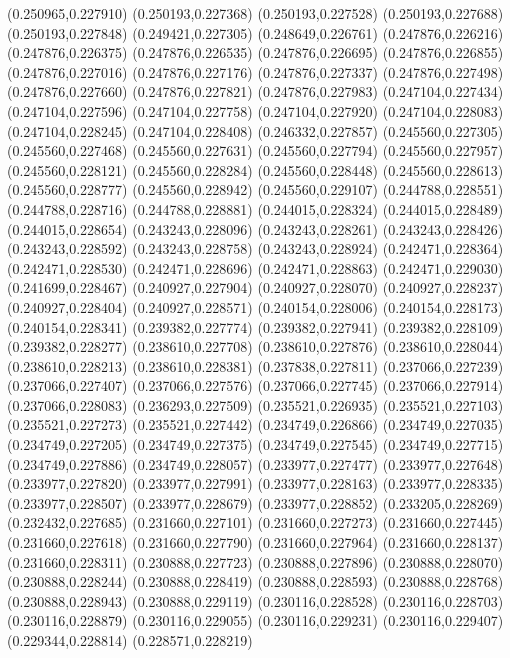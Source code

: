 (0.250965,0.227910)
(0.250193,0.227368)
(0.250193,0.227528)
(0.250193,0.227688)
(0.250193,0.227848)
(0.249421,0.227305)
(0.248649,0.226761)
(0.247876,0.226216)
(0.247876,0.226375)
(0.247876,0.226535)
(0.247876,0.226695)
(0.247876,0.226855)
(0.247876,0.227016)
(0.247876,0.227176)
(0.247876,0.227337)
(0.247876,0.227498)
(0.247876,0.227660)
(0.247876,0.227821)
(0.247876,0.227983)
(0.247104,0.227434)
(0.247104,0.227596)
(0.247104,0.227758)
(0.247104,0.227920)
(0.247104,0.228083)
(0.247104,0.228245)
(0.247104,0.228408)
(0.246332,0.227857)
(0.245560,0.227305)
(0.245560,0.227468)
(0.245560,0.227631)
(0.245560,0.227794)
(0.245560,0.227957)
(0.245560,0.228121)
(0.245560,0.228284)
(0.245560,0.228448)
(0.245560,0.228613)
(0.245560,0.228777)
(0.245560,0.228942)
(0.245560,0.229107)
(0.244788,0.228551)
(0.244788,0.228716)
(0.244788,0.228881)
(0.244015,0.228324)
(0.244015,0.228489)
(0.244015,0.228654)
(0.243243,0.228096)
(0.243243,0.228261)
(0.243243,0.228426)
(0.243243,0.228592)
(0.243243,0.228758)
(0.243243,0.228924)
(0.242471,0.228364)
(0.242471,0.228530)
(0.242471,0.228696)
(0.242471,0.228863)
(0.242471,0.229030)
(0.241699,0.228467)
(0.240927,0.227904)
(0.240927,0.228070)
(0.240927,0.228237)
(0.240927,0.228404)
(0.240927,0.228571)
(0.240154,0.228006)
(0.240154,0.228173)
(0.240154,0.228341)
(0.239382,0.227774)
(0.239382,0.227941)
(0.239382,0.228109)
(0.239382,0.228277)
(0.238610,0.227708)
(0.238610,0.227876)
(0.238610,0.228044)
(0.238610,0.228213)
(0.238610,0.228381)
(0.237838,0.227811)
(0.237066,0.227239)
(0.237066,0.227407)
(0.237066,0.227576)
(0.237066,0.227745)
(0.237066,0.227914)
(0.237066,0.228083)
(0.236293,0.227509)
(0.235521,0.226935)
(0.235521,0.227103)
(0.235521,0.227273)
(0.235521,0.227442)
(0.234749,0.226866)
(0.234749,0.227035)
(0.234749,0.227205)
(0.234749,0.227375)
(0.234749,0.227545)
(0.234749,0.227715)
(0.234749,0.227886)
(0.234749,0.228057)
(0.233977,0.227477)
(0.233977,0.227648)
(0.233977,0.227820)
(0.233977,0.227991)
(0.233977,0.228163)
(0.233977,0.228335)
(0.233977,0.228507)
(0.233977,0.228679)
(0.233977,0.228852)
(0.233205,0.228269)
(0.232432,0.227685)
(0.231660,0.227101)
(0.231660,0.227273)
(0.231660,0.227445)
(0.231660,0.227618)
(0.231660,0.227790)
(0.231660,0.227964)
(0.231660,0.228137)
(0.231660,0.228311)
(0.230888,0.227723)
(0.230888,0.227896)
(0.230888,0.228070)
(0.230888,0.228244)
(0.230888,0.228419)
(0.230888,0.228593)
(0.230888,0.228768)
(0.230888,0.228943)
(0.230888,0.229119)
(0.230116,0.228528)
(0.230116,0.228703)
(0.230116,0.228879)
(0.230116,0.229055)
(0.230116,0.229231)
(0.230116,0.229407)
(0.229344,0.228814)
(0.228571,0.228219)
